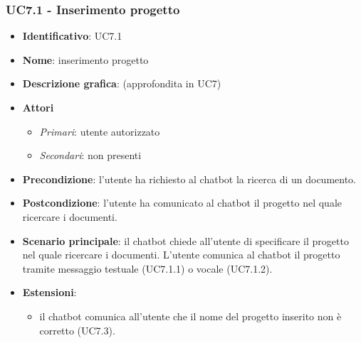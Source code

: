 \subsubsection{UC7.1 - Inserimento progetto}
\begin{itemize}
    \item \textbf{Identificativo}: UC7.1
    \item \textbf{Nome}: inserimento progetto
    \item \textbf{Descrizione grafica}: (approfondita in UC7)
    \item \textbf{Attori}
 \begin{itemize} 
    \item \textit{Primari}: utente autorizzato
    \item \textit{Secondari}: non presenti
 \end{itemize}
 \item \textbf{Precondizione}: l'utente ha richiesto al chatbot la ricerca di un documento.
 \item \textbf{Postcondizione}:  l'utente ha comunicato al chatbot il progetto nel quale ricercare i documenti.
 \item \textbf{Scenario principale}: il chatbot chiede all'utente di specificare il progetto nel quale ricercare i documenti. L'utente comunica al chatbot il progetto tramite messaggio testuale (UC7.1.1) o vocale (UC7.1.2).
 \item \textbf{Estensioni}: 
 \begin{itemize} 
    \item il chatbot comunica all'utente che il nome del progetto inserito non è corretto (UC7.3).
 \end{itemize}
\end{itemize}
